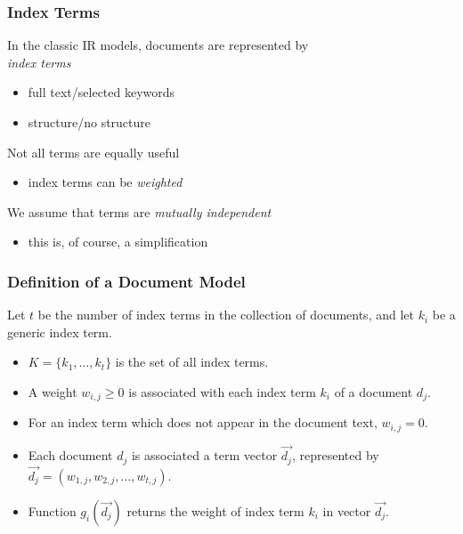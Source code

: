\documentclass[svgnames]{beamer}
\newcommand{\wij}{\ensuremath{w_{i,j}}}
\begin{document}
\begin{frame} \frametitle{Index Terms}
  
  \begin{block}{}
    In the classic IR models, documents are represented by \\
    \emph{index terms}
      \begin{itemize}
      \item full text/selected keywords
      \item structure/no structure
      \end{itemize}
   \end{block}

  \begin{block}{}
      Not all terms are equally useful
      \begin{itemize}
      \item index terms can be \emph{weighted}
      \end{itemize}
   \end{block}

  \begin{block}{}
    We assume that terms are \emph{mutually independent}
      \begin{itemize}
      \item this is, of course, a simplification
      \end{itemize}
  \end{block}

\end{frame}

\begin{frame} \frametitle{Definition of a Document Model}
  
  \begin{definition}
    Let $t$ be the number of index terms in the collection of documents, and
    let $k_i$ be a generic index term.
    \begin{itemize}
    \item $K=\{k_1, \ldots, k_t\}$ is the set of all index terms.
    \item A weight $\wij \geq 0$ is associated with each index term $k_i$ of
      a document $d_j$.
    \item For an index term which does not appear in the document text,
      $\wij=0$.
    \item Each document $d_j$ is associated a term vector $\vec{d_j}$,
      represented by $\vec{d_j}=(w_{1,j}, w_{2,j}, \ldots, w_{t,j})$.
    \item Function $g_i(\vec{d_j})$ returns the weight of index term $k_i$ in
      vector $\vec{d_j}$.
    \end{itemize}
  \end{definition}

\end{frame}
\end{document}
